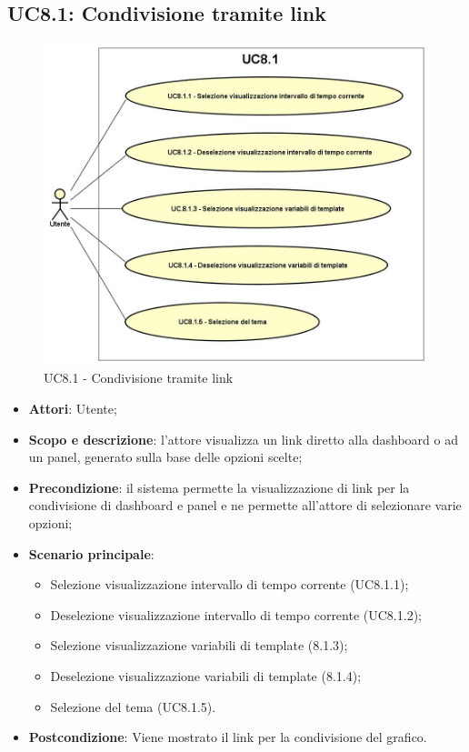 \subsection{UC8.1: Condivisione tramite link}
\hypertarget{UC8.1}{}
\begin{figure} [H]
	\centering
	\includegraphics[scale=0.45]{Img/UC8-1}
	\caption{UC8.1 - Condivisione tramite link}\label{}
\end{figure}
\begin{itemize}
	\item \textbf{Attori}: Utente;
	\item \textbf{Scopo e descrizione}: l'attore visualizza un link diretto alla dashboard o ad un panel, generato sulla base delle opzioni scelte;
	\item \textbf{Precondizione}: il sistema permette la visualizzazione di link per la condivisione di dashboard e panel e ne permette all'attore di selezionare varie opzioni;
	\item \textbf{Scenario principale}:
	\begin{itemize}
		\item Selezione visualizzazione intervallo di tempo corrente (UC8.1.1);
		\item Deselezione visualizzazione intervallo di tempo corrente (UC8.1.2);
		\item Selezione visualizzazione variabili di template (8.1.3);
		\item Deselezione visualizzazione variabili di template (8.1.4);
		\item Selezione del tema (UC8.1.5).
	\end{itemize}
	\item \textbf{Postcondizione}: Viene mostrato il link per la condivisione del grafico.
\end{itemize}

